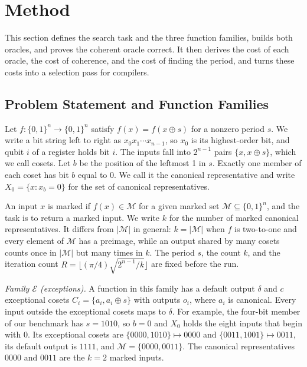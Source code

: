 \documentclass[journal]{IEEEtran}
\newcommand{\Xo}{X_0}
\newcommand{\famE}{\mathcal{E}}
\begin{document}
\section{Method}
\label{sec:method}

This section defines the search task and the three function families, builds
both oracles, and proves the coherent oracle correct. It then derives the cost of
each oracle, the cost of coherence, and the cost of finding the period, and turns
these costs into a selection pass for compilers.

\subsection{Problem Statement and Function Families}
\label{sec:problem}

Let $f:\{0,1\}^n\to\{0,1\}^n$ satisfy $f(x)=f(x\oplus s)$ for a nonzero period
$s$. We write a bit string left to right as $x_0x_1\cdots x_{n-1}$, so $x_0$ is
its highest-order bit, and qubit $i$ of a register holds bit $i$. The inputs
fall into $2^{n-1}$ pairs $\{x,x\oplus s\}$, which we call cosets. Let $b$ be the
position of the leftmost 1 in $s$. Exactly one member of
each coset has bit $b$ equal to 0. We call it the canonical representative and
write $\Xo=\{x: x_b=0\}$ for the set of canonical representatives.

An input $x$ is marked if $f(x)\in\mathcal{M}$ for a given marked set
$\mathcal{M}\subseteq\{0,1\}^n$, and the task is to return a marked input. We
write $k$ for the number of marked canonical representatives. It differs from
$|\mathcal{M}|$ in general: $k=|\mathcal{M}|$ when $f$ is two-to-one and every
element of $\mathcal{M}$ has a preimage, while an output shared by many cosets
counts once in $|\mathcal{M}|$ but many times in $k$. The period $s$, the count
$k$, and the iteration count $R=\lfloor(\pi/4)\sqrt{2^{n-1}/k}\rfloor$ are fixed
before the run.

\textit{Family $\famE$ (exceptions).} A function in this family has a default
output $\delta$ and $c$ exceptional cosets $C_i=\{a_i,a_i\oplus s\}$ with
outputs $o_i$, where $a_i$ is canonical. Every input outside the exceptional
cosets maps to $\delta$. For example, the four-bit member of our benchmark has
$s=1010$, so $b=0$ and $\Xo$ holds the eight inputs that begin with 0. Its
exceptional cosets are $\{0000,1010\}\mapsto 0000$ and $\{0011,1001\}\mapsto
0011$, its default output is $1111$, and $\mathcal{M}=\{0000,0011\}$. The
canonical representatives $0000$ and $0011$ are the $k=2$ marked inputs.
\end{document}
